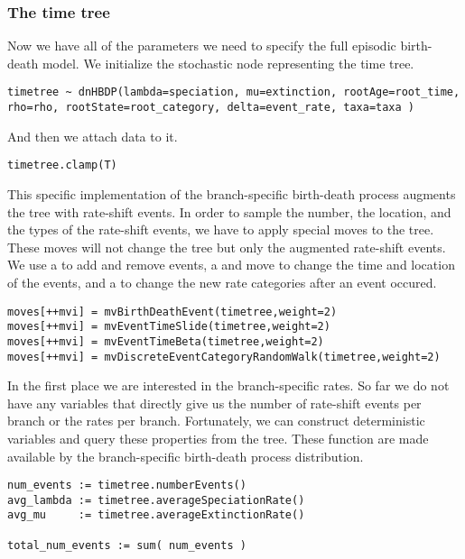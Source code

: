 \subsubsection{The time tree}

Now we have all of the parameters we need to specify the full episodic birth-death model. 
We initialize the stochastic node representing the time tree.
{\tt \begin{snugshade*}
\begin{lstlisting}
timetree ~ dnHBDP(lambda=speciation, mu=extinction, rootAge=root_time, rho=rho, rootState=root_category, delta=event_rate, taxa=taxa )
\end{lstlisting}
\end{snugshade*}}
And then we attach data to it.
{\tt \begin{snugshade*}
\begin{lstlisting}
timetree.clamp(T)
\end{lstlisting}
\end{snugshade*}}

This specific implementation of the branch-specific birth-death process augments the tree with rate-shift events.
In order to sample the number, the location, and the types of the rate-shift events, we have to apply special moves to the tree.
These moves will not change the tree but only the augmented rate-shift events.
We use a  to add and remove events, a  and  move to change the time and location of the events, 
and a  to change the new rate categories after an event occured.
{\tt \begin{snugshade*}
\begin{lstlisting}
moves[++mvi] = mvBirthDeathEvent(timetree,weight=2)
moves[++mvi] = mvEventTimeSlide(timetree,weight=2)
moves[++mvi] = mvEventTimeBeta(timetree,weight=2)
moves[++mvi] = mvDiscreteEventCategoryRandomWalk(timetree,weight=2)
\end{lstlisting}
\end{snugshade*}}

In the first place we are interested in the branch-specific rates.
So far we do not have any variables that directly give us the number of rate-shift events per branch or the rates per branch.
Fortunately, we can construct deterministic variables and query these properties from the tree.
These function are made available by the branch-specific birth-death process distribution.
{\tt \begin{snugshade*}
\begin{lstlisting}
num_events := timetree.numberEvents()
avg_lambda := timetree.averageSpeciationRate()
avg_mu     := timetree.averageExtinctionRate()

total_num_events := sum( num_events )
\end{lstlisting}
\end{snugshade*}}


